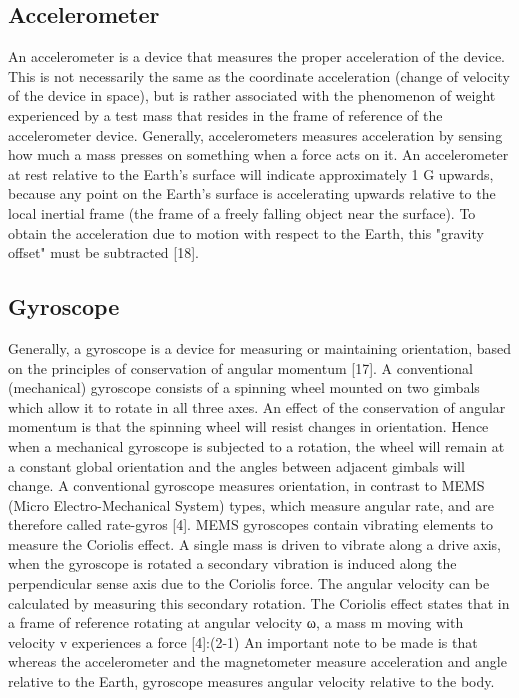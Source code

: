 \subsection{Accelerometer}
An accelerometer is a device that measures the proper acceleration of the device. This is not
necessarily the same as the coordinate acceleration (change of velocity of the device in space),
but is rather associated with the phenomenon of weight experienced by a test mass that resides
in the frame of reference of the accelerometer device.
Generally, accelerometers measures acceleration by sensing how much a mass presses on
something when a force acts on it.
An accelerometer at rest relative to the Earth's surface will indicate approximately 1 G
upwards, because any point on the Earth's surface is accelerating upwards relative to the local
inertial frame (the frame of a freely falling object near the surface). To obtain the acceleration
due to motion with respect to the Earth, this "gravity offset" must be subtracted [18]. 
\subsection{Gyroscope}
Generally, a gyroscope is a device for measuring or maintaining orientation, based on the
principles of conservation of angular momentum [17].
A conventional (mechanical) gyroscope consists of a spinning wheel mounted on two gimbals
which allow it to rotate in all three axes. An effect of the conservation of angular momentum
is that the spinning wheel will resist changes in orientation. Hence when a mechanical
gyroscope is subjected to a rotation, the wheel will remain at a constant global orientation and
the angles between adjacent gimbals will change. A conventional gyroscope measures
orientation, in contrast to MEMS (Micro Electro-Mechanical System) types, which measure
angular rate, and are therefore called rate-gyros [4].
MEMS gyroscopes contain vibrating elements to measure the Coriolis effect. A single mass is
driven to vibrate along a drive axis, when the gyroscope is rotated a secondary vibration is
induced along the perpendicular sense axis due to the Coriolis force. The angular velocity can
be calculated by measuring this secondary rotation.
The Coriolis effect states that in a frame of reference rotating at angular velocity ω, a mass m
moving with velocity v experiences a force [4]:(2-1)
An important note to be made is that whereas the accelerometer and the magnetometer
measure acceleration and angle relative to the Earth, gyroscope measures angular velocity
relative to the body.
